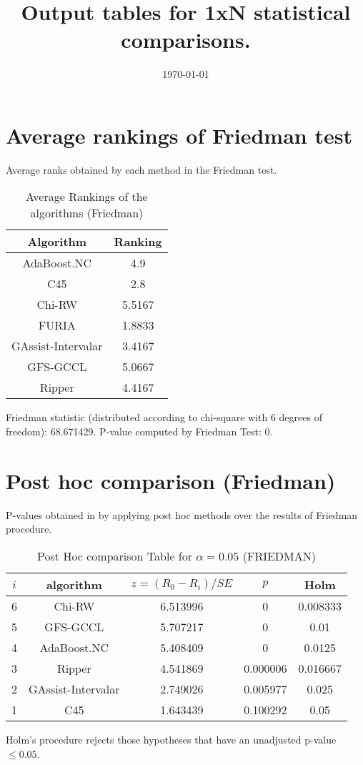 \documentclass[a4paper,10pt]{article}
\title{Output tables for 1xN statistical comparisons.}
\author{}
\date{\today}
\begin{document}
\pagestyle{empty}
\maketitle
\thispagestyle{empty}

\section{Average rankings of Friedman test}


Average ranks obtained by each method in the Friedman test.

\begin{table}[!htp]
\centering
\begin{tabular}{|c|c|}\hline
Algorithm&Ranking\\\hline
 AdaBoost.NC &4.9\\ C45 &2.8\\ Chi-RW &5.5167\\ FURIA &1.8833\\ GAssist-Intervalar &3.4167\\ GFS-GCCL &5.0667\\ Ripper&4.4167\\\hline\end{tabular}
\caption{Average Rankings of the algorithms (Friedman)}
\end{table}

Friedman statistic (distributed according to chi-square with 6 degrees of freedom): 68.671429. \newline P-value computed by Friedman Test: 0.\newline


\newpage

\section{Post hoc comparison (Friedman)}


P-values obtained in by applying post hoc methods over the results of Friedman procedure.

\begin{table}[!htp]
\centering\footnotesize
\begin{tabular}{ccccc}
$i$&algorithm&$z=(R_0 - R_i)/SE$&$p$&Holm \\
\hline6& Chi-RW &6.513996&0&0.008333\\5& GFS-GCCL &5.707217&0&0.01\\4& AdaBoost.NC &5.408409&0&0.0125\\3& Ripper&4.541869&0.000006&0.016667\\2& GAssist-Intervalar &2.749026&0.005977&0.025\\1& C45 &1.643439&0.100292&0.05\\\hline
\end{tabular}
\caption{Post Hoc comparison Table for $\alpha=0.05$ (FRIEDMAN)}
\end{table}Holm's procedure rejects those hypotheses that have an unadjusted p-value $\le0.05$.
\end{document}
